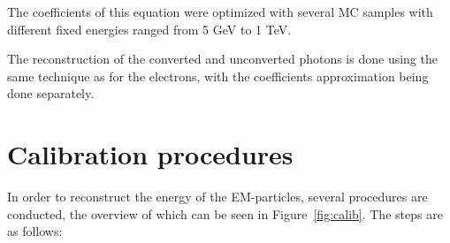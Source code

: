 The coefficients of this equation were optimized with several MC samples with different fixed energies ranged from 5 GeV to 1 TeV.

The reconstruction of the converted and unconverted photons is done using the same technique as for the electrons, with the coefficients approximation being done separately.

\section{Calibration procedures}

\begin{figure}
\end{figure}

In order to reconstruct the energy of the EM-particles, several procedures are conducted, the overview of which can be seen in Figure~\ref{fig:calib}. The steps are as follows:

